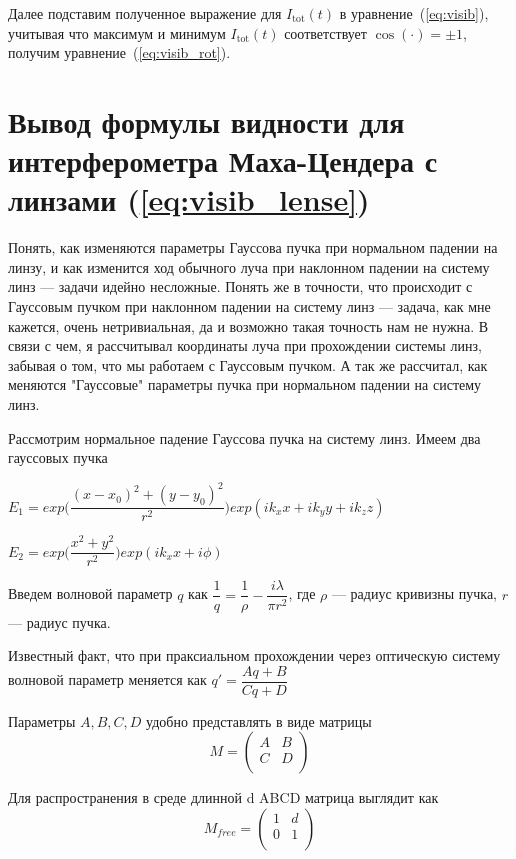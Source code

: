 Далее подставим полученное выражение для $I_{\mathrm{tot}}(t)$ в уравнение~(\ref{eq:visib}), учитывая что максимум и минимум $I_{\mathrm{tot}}(t)$ соответствует $\cos(\cdot) = \pm 1$, получим уравнение~(\ref{eq:visib_rot}).


\section{Вывод формулы видности для интерферометра Маха-Цендера с линзами (\ref{eq:visib_lense})}\label{app:B2}


Понять, как изменяются параметры Гауссова пучка при нормальном падении на линзу, и как изменится ход обычного луча при наклонном падении на систему линз --- задачи идейно несложные. Понять же в точности, что происходит с Гауссовым пучком при наклонном падении на систему линз --- задача, как мне кажется, очень нетривиальная, да и возможно такая точность нам не нужна. В связи с чем, я рассчитывал координаты луча при прохождении системы линз, забывая о том, что мы работаем с Гауссовым пучком. А так же рассчитал, как меняются "Гауссовые" параметры пучка при нормальном падении на систему линз.

Рассмотрим нормальное падение Гауссова пучка на систему линз. Имеем два гауссовых пучка


$E_{1} = exp\Big(\dfrac{(x - x_{0})^2  + (y - y_{0})^2}{r^2}\Big) exp(ik_{x} x + ik_{y} y + ik_{z} z)$


$E_{2} = exp\Big(\dfrac{x^2  + y^2}{r^2}\Big) exp(ik_{x} x + i\phi)$

Введем волновой параметр $q$ как $\dfrac{1}{q} = \dfrac{1}{\rho} - \dfrac{i \lambda}{\pi r^2}$, где $\rho$ --- радиус кривизны пучка, $r$ --- радиус пучка.

Известный факт, что при праксиальном прохождении через оптическую систему волновой параметр меняется как $q' = \dfrac{Aq + B}{Cq + D}$

Параметры $A, B, C, D$ удобно представлять в виде матрицы \begin{equation*}
M =
\begin{pmatrix}
A & B \\
C & D \\
\end{pmatrix}
\end{equation*}

Для распространения в среде длинной d ABCD матрица выглядит как 
 \begin{equation*}
M_{free} =
\begin{pmatrix}
1 & d \\
0 & 1 \\
\end{pmatrix}
\end{equation*}

